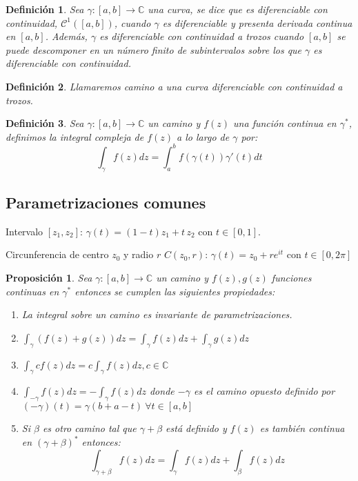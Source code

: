 \documentclass[12pt]{book}
\newtheorem{defi}{Definición}[chapter]
\newtheorem{prop}{Proposición}[chapter]
\newcommand{\C}{\mathbb{C}}
\begin{document}
\begin{defi}
Sea $\gamma:[a,b]\longrightarrow \C$ una curva, se dice que es diferenciable con continuidad, $\mathcal{C}^1([a,b])$, cuando $\gamma$ es diferenciable y presenta derivada continua en $[a,b]$. Además, $\gamma$ es diferenciable con continuidad a trozos cuando $[a,b]$ se puede descomponer en un número finito de subintervalos sobre los que $\gamma$ es diferenciable con continuidad.
\end{defi}

\begin{defi}
Llamaremos camino a una curva diferenciable con continuidad a trozos.

\end{defi}

\begin{defi}
Sea  $\gamma:[a,b]\longrightarrow \C$ un camino y $f(z)$ una función continua en $\gamma^*$, definimos la integral compleja de $f(z)$ a lo largo de $\gamma$ por:
$$
\int_{\gamma} f(z) dz = \int_a^b f(\gamma(t)) \gamma'(t)dt
$$
\end{defi}

\subsection*{Parametrizaciones comunes}
Intervalo $[z_1,z_2]$: $\gamma(t) = (1-t)z_1 +t \, z_2$ con $t\in [0,1]$.

Circunferencia de centro $z_0$ y radio $r$ $C(z_0,r)$: $\gamma(t) = z_0 + re^{it}$ con $t\in[0,2\pi]$ 

\begin{prop}
Sea $\gamma:[a,b]\longrightarrow \C$ un camino y $f(z), g(z)$ funciones continuas en $\gamma^*$ entonces se cumplen las siguientes propiedades:
\begin{enumerate}
\item La integral sobre un camino es invariante de parametrizaciones.
\item $\int_\gamma (f(z)+g(z)) dz = \int_\gamma f(z)dz + \int_\gamma g(z) dz$
\item $\int_\gamma c f(z) dz = c \int_\gamma f(z) dz, c\in\C$
\item $\int_{-\gamma} f(z) dz = -\int_\gamma f(z) dz$ donde $-\gamma$ es el camino opuesto definido por $(-\gamma)(t) = \gamma(b+a-t) \ \forall t \in [a,b]$
\item Si $\beta$ es otro camino tal que $\gamma + \beta$ está definido y $f(z)$ es también continua en $(\gamma+\beta)^*$ entonces:
$$
\int_{\gamma+\beta}f(z)dz = \int_\gamma f(z)dz + \int_\beta f(z)dz
$$
\end{enumerate}
\end{prop}
\end{document}
